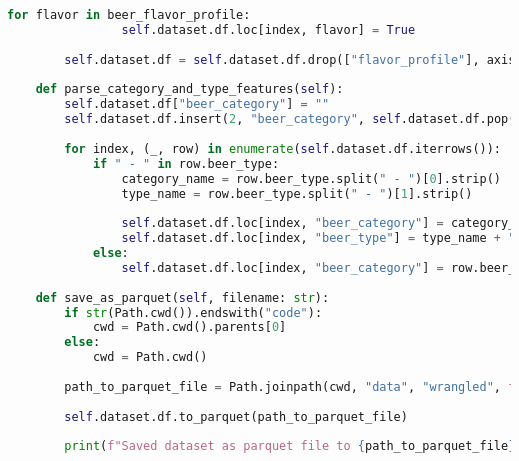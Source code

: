 \documentclass[sigconf]{acmart}
\begin{document}
\begin{lstlisting}[language=Python]
            for flavor in beer_flavor_profile:
                self.dataset.df.loc[index, flavor] = True
            
        self.dataset.df = self.dataset.df.drop(["flavor_profile"], axis=1)
    
    def parse_category_and_type_features(self):
        self.dataset.df["beer_category"] = ""
        self.dataset.df.insert(2, "beer_category", self.dataset.df.pop("beer_category"))
        
        for index, (_, row) in enumerate(self.dataset.df.iterrows()):
            if " - " in row.beer_type:
                category_name = row.beer_type.split(" - ")[0].strip()
                type_name = row.beer_type.split(" - ")[1].strip()
                
                self.dataset.df.loc[index, "beer_category"] = category_name
                self.dataset.df.loc[index, "beer_type"] = type_name + " " + category_name
            else:
                self.dataset.df.loc[index, "beer_category"] = row.beer_type
    
    def save_as_parquet(self, filename: str):
        if str(Path.cwd()).endswith("code"):
            cwd = Path.cwd().parents[0]
        else:
            cwd = Path.cwd()
        
        path_to_parquet_file = Path.joinpath(cwd, "data", "wrangled", f"{filename}.parquet")
        
        self.dataset.df.to_parquet(path_to_parquet_file)
        
        print(f"Saved dataset as parquet file to {path_to_parquet_file}")
\end{lstlisting}
\end{document}
